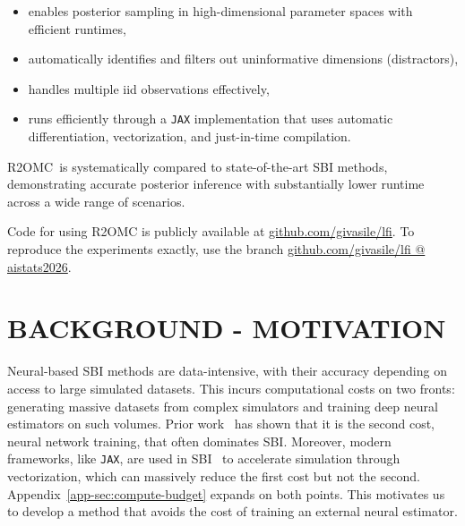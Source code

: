\documentclass[twoside]{article}
\newlength{\secvspace}
\newlength{\subsecvspace}
\newcommand{\rromc}{R2OMC}
\begin{document}
\begin{itemize}
 \item enables posterior sampling in high-dimensional parameter spaces with efficient runtimes,
 \item automatically identifies and filters out uninformative dimensions (distractors),
 \item handles multiple iid observations effectively,
 \item runs efficiently through a \texttt{JAX} implementation that uses automatic differentiation, vectorization, and just-in-time compilation.
 \end{itemize}

 \rromc~is systematically compared to state-of-the-art SBI methods, demonstrating accurate posterior inference with substantially lower runtime across a wide range of scenarios.

 Code for using R2OMC is publicly available at \href{https://github.com/givasile/lfi}{github.com/givasile/lfi}.
 To reproduce the experiments exactly, use the branch \href{https://github.com/givasile/lfi/tree/aistats2026}{github.com/givasile/lfi @ aistats2026}.

\vspace{\secvspace}
\section{BACKGROUND - MOTIVATION}
\vspace{\secvspace}

Neural-based SBI methods are data-intensive, with their accuracy depending on access to large simulated datasets.
This incurs computational costs on two fronts:
generating massive datasets from complex simulators and
training deep neural estimators on such volumes.
Prior work~\citep{lueckmann2021benchmarking} has shown that it is the second cost, neural network training, that often dominates SBI.
Moreover, modern frameworks, like \texttt{JAX}, are used in SBI~\citep{dirmeier2024simulation, quera2023blackbirds} to accelerate simulation through vectorization, which can massively reduce the first cost but not the second.
Appendix~\ref{app-sec:compute-budget} expands on both points. 
This motivates us to develop a method that avoids the cost of training an external neural estimator.
 
\vspace{\subsecvspace}
\end{document}
